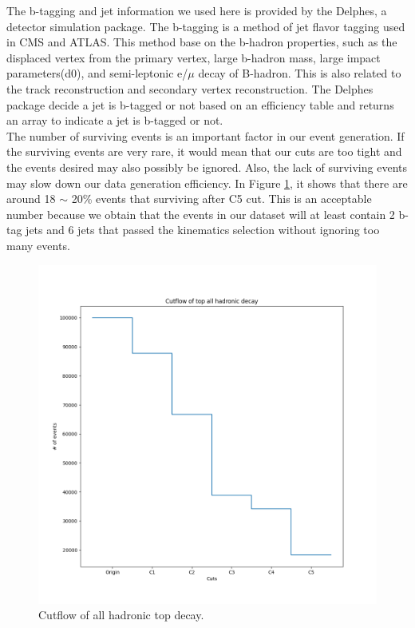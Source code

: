 The b-tagging and jet information we used here is provided by the Delphes, a detector simulation package.\cite{deFavereau:2013fsa} The b-tagging is a method of jet flavor tagging used in CMS and ATLAS.\cite{ATLAS:2016gsw}\cite{Sirunyan:2017ezt} This method base on the b-hadron properties, such as the displaced vertex from the primary vertex, large b-hadron mass, large impact parameters(d0), and semi-leptonic e/$\mu$ decay of B-hadron. This is also related to the track reconstruction and secondary vertex reconstruction. The Delphes package decide a jet is b-tagged or not based on an efficiency table and returns an array to indicate a jet is b-tagged or not.
\\
The number of surviving events is an important factor in our event generation. If the surviving events are very rare, it would mean that our cuts are too tight and the events desired may also possibly be ignored. Also, the lack of surviving events may slow down our data generation efficiency. In Figure \ref{fig:cutflow}, it shows that there are around 18 $\sim$ 20\% events that surviving after C5 cut. This is an acceptable number because we obtain that the events in our dataset will at least contain 2 b-tag jets and 6 jets that passed the kinematics selection without ignoring too many events.
\\
\begin{figure}[H]
	\includegraphics[width=0.9\linewidth]{Figures/ttbar_cutflow.png}
	\caption{Cutflow of all hadronic top decay.}
	\label{fig:cutflow}
\end{figure}
